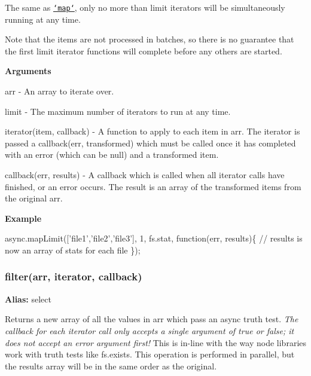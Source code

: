 The same as \href{#map}{\tt `map`}, only no more than {\ttfamily limit} {\ttfamily iterator}s will be simultaneously running at any time.

Note that the items are not processed in batches, so there is no guarantee that the first {\ttfamily limit} {\ttfamily iterator} functions will complete before any others are started.

{\bfseries Arguments}


\begin{DoxyItemize}
\item {\ttfamily arr} -\/ An array to iterate over.
\item {\ttfamily limit} -\/ The maximum number of {\ttfamily iterator}s to run at any time.
\item {\ttfamily iterator(item, callback)} -\/ A function to apply to each item in {\ttfamily arr}. The iterator is passed a {\ttfamily callback(err, transformed)} which must be called once it has completed with an error (which can be {\ttfamily null}) and a transformed item.
\item {\ttfamily callback(err, results)} -\/ A callback which is called when all {\ttfamily iterator} calls have finished, or an error occurs. The result is an array of the transformed items from the original {\ttfamily arr}.
\end{DoxyItemize}

{\bfseries Example}


\begin{DoxyCode}
async.mapLimit([\textcolor{stringliteral}{'file1'},\textcolor{stringliteral}{'file2'},\textcolor{stringliteral}{'file3'}], 1, fs.stat, \textcolor{keyword}{function}(err, results)\{
    \textcolor{comment}{// results is now an array of stats for each file}
\});
\end{DoxyCode}
 



\label{_select}%
 \label{_filter}%
 \subsubsection*{filter(arr, iterator, callback)}

{\bfseries Alias\+:} {\ttfamily select}

Returns a new array of all the values in {\ttfamily arr} which pass an async truth test. {\itshape The callback for each {\ttfamily iterator} call only accepts a single argument of {\ttfamily true} or {\ttfamily false}; it does not accept an error argument first!} This is in-\/line with the way node libraries work with truth tests like {\ttfamily fs.\+exists}. This operation is performed in parallel, but the results array will be in the same order as the original.

